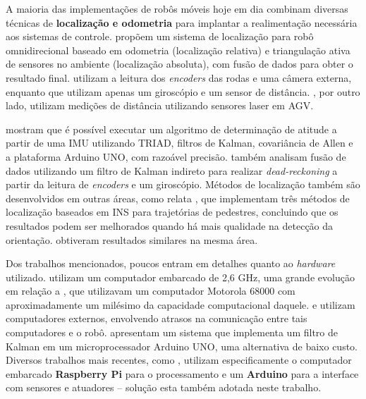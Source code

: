 A maioria das implementações de robôs móveis hoje em dia combinam diversas técnicas de \textbf{localização e odometria} para implantar a realimentação necessária aos sistemas de controle. \cite{ginzburg2013indoor} propõem um sistema de localização para robô omnidirecional baseado em odometria (localização relativa) e triangulação ativa de sensores no ambiente (localização absoluta), com fusão de dados para obter o resultado final. \cite{rojas2006holonomic} utilizam a leitura dos \emph{encoders} das rodas e uma câmera externa, enquanto que \cite{garcia2015gyro} utilizam apenas um giroscópio e um sensor de distância. \cite{rohrig2010laser}, por outro lado, utilizam medições de distância utilizando sensores laser em AGV.

\cite{lowcostIMU} mostram que é possível executar um algoritmo de determinação de atitude a partir de uma IMU utilizando TRIAD, filtros de Kalman, covariância de Allen e a plataforma Arduino UNO, com razoável precisão. \cite{park1996dead} também analisam fusão de dados utilizando um filtro de Kalman indireto para realizar \emph{dead-reckoning} a partir da leitura de \emph{encoders} e um giroscópio. Métodos de localização também são desenvolvidos em outras áreas, como relata \cite{jimenez2009comparison}, que implementam três métodos de localização baseados em INS para trajetórias de pedestres, concluindo que os resultados podem ser melhorados quando há mais qualidade na detecção da orientação. \cite{steinhoff2010pocket} obtiveram resultados similares na mesma área.

Dos trabalhos mencionados, poucos entram em detalhes quanto ao \emph{hardware} utilizado. \cite{oubbati2005velocity} utilizam um computador embarcado de 2,6 GHz, uma grande evolução em relação a \cite{feng1989servo}, que utilizavam um computador Motorola 68000 com aproximadamente um milésimo da capacidade computacional daquele. \cite{takemura2007development} e \cite{loh2003mechatronics} utilizam computadores externos, envolvendo atrasos na comunicação entre tais computadores e o robô. \cite{lowcostIMU} apresentam um sistema que implementa um filtro de Kalman em um microprocessador Arduino UNO, uma alternativa de baixo custo. Diversos trabalhos mais recentes, como \cite{krinkin2015design}, utilizam especificamente o computador embarcado \textbf{Raspberry Pi} para o processamento e um \textbf{Arduino} para a interface com sensores e atuadores -- solução esta também adotada neste trabalho.
